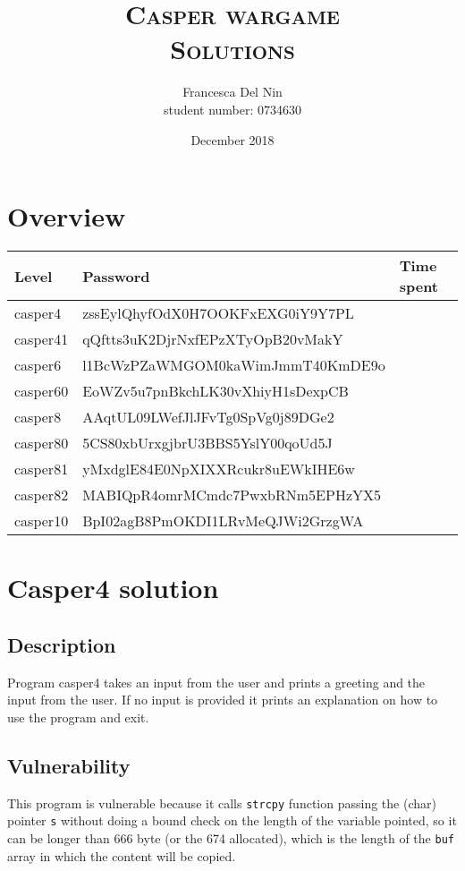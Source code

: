 \documentclass[a4paper,12pt]{article}
\title{\scshape Casper wargame \\ Solutions}
\author{Francesca Del Nin \\ student number: 0734630}
\date{December 2018}
\begin{document}
\maketitle


\section{Overview}
\begin{table}[]
\begin{tabular}{lll}
 Level & Password & Time spent  \\
 \hline
 casper4 & zssEylQhyfOdX0H7OOKFxEXG0iY9Y7PL &   \\
 casper41 & qQftts3uK2DjrNxfEPzXTyOpB20vMakY &   \\
 casper6 & l1BcWzPZaWMGOM0kaWimJmmT40KmDE9o &  \\
 casper60 & EoWZv5u7pnBkchLK30vXhiyH1sDexpCB & \\
 casper8 & AAqtUL09LWefJlJFvTg0SpVg0j89DGe2 & \\
 casper80 & 5CS80xbUrxgjbrU3BBS5YslY00qoUd5J & \\
 casper81 & yMxdglE84E0NpXIXXRcukr8uEWkIHE6w & \\
 casper82 & MABIQpR4omrMCmdc7PwxbRNm5EPHzYX5 & \\
 casper10 & BpI02agB8PmOKDI1LRvMeQJWi2GrzgWA &\\
\end{tabular}
\end{table}

\newpage
\section{Casper4 solution}
\subsection{Description}
Program casper4 takes an input from the user and prints a greeting and the input from the user. If no input is provided it prints an explanation on how to use the program and exit.
 

\subsection{Vulnerability}

This program is vulnerable because it calls \texttt{strcpy} function passing the (char) pointer \texttt{s} without doing a bound check on the length of the variable pointed, so it can be longer than 666 byte (or the 674 allocated), which is the length of the \texttt{buf} array in which the content will be copied.
\end{document}
